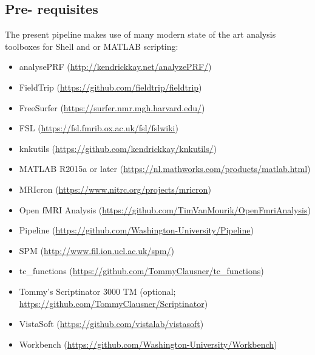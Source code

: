 \documentclass[12pt,a4paper]{scrartcl}
\begin{document}
\subsection{Pre- requisites}
\label{sec:prereq}
The present pipeline makes use of many modern state of the art analysis toolboxes for Shell and or MATLAB scripting:
\begin{itemize}
\item analysePRF (\href{http://kendrickkay.net/analyzePRF/}{http://kendrickkay.net/analyzePRF/})
\item FieldTrip (\href{https://github.com/fieldtrip/fieldtrip}{https://github.com/fieldtrip/fieldtrip})
\item FreeSurfer (\href{https://surfer.nmr.mgh.harvard.edu/}{https://surfer.nmr.mgh.harvard.edu/})
\item FSL (\href{https://fsl.fmrib.ox.ac.uk/fsl/fslwiki}{https://fsl.fmrib.ox.ac.uk/fsl/fslwiki})
\item knkutils (\href {https://github.com/kendrickkay/knkutils/}{https://github.com/kendrickkay/knkutils/})
\item MATLAB R2015a or later (\href{https://nl.mathworks.com/products/matlab.html}{https://nl.mathworks.com/products/matlab.html})
\item MRIcron (\href{https://www.nitrc.org/projects/mricron}{https://www.nitrc.org/projects/mricron})
\item Open fMRI Analysis (\href{https://github.com/TimVanMourik/OpenFmriAnalysis}{https://github.com/TimVanMourik/OpenFmriAnalysis})
\item Pipeline (\href{https://github.com/Washington-University/Pipeline}{https://github.com/Washington-University/Pipeline})
\item SPM (\href{http://www.fil.ion.ucl.ac.uk/spm/}{http://www.fil.ion.ucl.ac.uk/spm/})
\item tc\_functions  (\href{https://github.com/TommyClausner/tc\_functions}{https://github.com/TommyClausner/tc\_functions})
\item Tommy's Scriptinator 3000 TM (optional; \href{https://github.com/TommyClausner/Scriptinator}{https://github.com/TommyClausner/Scriptinator})
\item VistaSoft (\href{https://github.com/vistalab/vistasoft}{https://github.com/vistalab/vistasoft})
\item Workbench (\href{https://github.com/Washington-University/Workbench}{https://github.com/Washington-University/Workbench})
\end{itemize}
\end{document}
